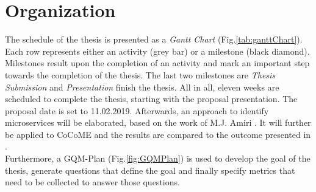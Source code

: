 \chapter{Organization}
\label{ch:timetable}
The schedule of the thesis is presented as a \textit{Gantt Chart} (Fig.\ref{tab:ganttChart}). Each row represents either an activity (grey bar) or a milestone (black diamond). Milestones result upon the completion of an activity and mark an important step towards the completion of the thesis. The last two milestones are \textit{Thesis Submission} and \textit{Presentation} finish the thesis. All in all, eleven weeks are scheduled to complete the thesis, starting with the proposal presentation. The proposal date is set to 11.02.2019. Afterwards, an approach to identify microservices will be elaborated, based on the work of M.J. Amiri \cite{ObjectAwareAmiri}.  It will further be applied to CoCoME and the results are compared to the outcome presented in \cite{FunctionalDecompositionHeinrich}.\\
Furthermore, a GQM-Plan (Fig.\ref{fig:GQMPlan}) is used to develop the goal of the thesis, generate questions that define the goal and finally specify metrics that need to be collected to answer those questions. 




